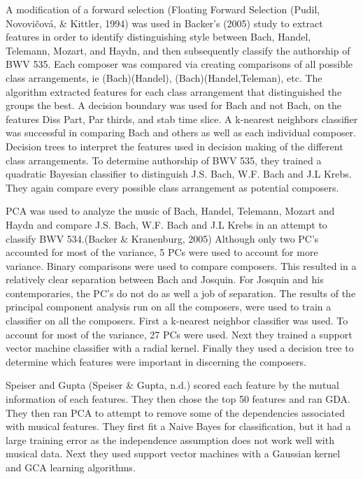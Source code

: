 \documentclass[12pt,twoside]{reedthesis}
\theoremstyle{definition}
\theoremstyle{definition}
\theoremstyle{definition}
\theoremstyle{remark}
\begin{document}
A modification of a forward selection (Floating Forward Selection
(Pudil, Novovičová, \& Kittler, 1994) was used in Backer's (2005) study
to extract features in order to identify distinguishing style between
Bach, Handel, Telemann, Mozart, and Haydn, and then subsequently
classify the authorship of BWV 535. Each composer was compared via
creating comparisons of all possible class arrangements, ie
(Bach)(Handel), (Bach)(Handel,Teleman), etc. The algorithm extracted
features for each class arrangement that distinguished the groups the
best. A decision boundary was used for Bach and not Bach, on the
features Diss Part, Par thirds, and stab time slice. A k-nearest
neighbors classifier was successful in comparing Bach and others as well
as each individual composer. Decision trees to interpret the features
used in decision making of the different class arrangements. To
determine authorship of BWV 535, they trained a quadratic Bayesian
classifier to distinguish J.S. Bach, W.F. Bach and J.L Krebs. They again
compare every possible class arrangement as potential composers.

PCA was used to analyze the music of Bach, Handel, Telemann, Mozart and
Haydn and compare J.S. Bach, W.F. Bach and J.L Krebs in an attempt to
classify BWV 534.(Backer \& Kranenburg, 2005) Although only two PC's
accounted for most of the variance, 5 PCs were used to account for more
variance. Binary comparisons were used to compare composers. This
resulted in a relatively clear separation between Bach and Josquin. For
Josquin and his contemporaries, the PC's do not do as well a job of
separation. The results of the principal component analysis run on all
the composers, were used to train a classifier on all the composers.
First a k-nearest neighbor classifier was used. To account for most of
the variance, 27 PCs were used. Next they trained a support vector
machine classifier with a radial kernel. Finally they used a decision
tree to determine which features were important in discerning the
composers.

Speiser and Gupta (Speiser \& Gupta, n.d.) scored each feature by the
mutual information of each features. They then chose the top 50 features
and ran GDA. They then ran PCA to attempt to remove some of the
dependencies associated with musical features. They first fit a Naive
Bayes for classification, but it had a large training error as the
independence assumption does not work well with musical data. Next they
used support vector machines with a Gaussian kernel and GCA learning
algorithms.
\end{document}
